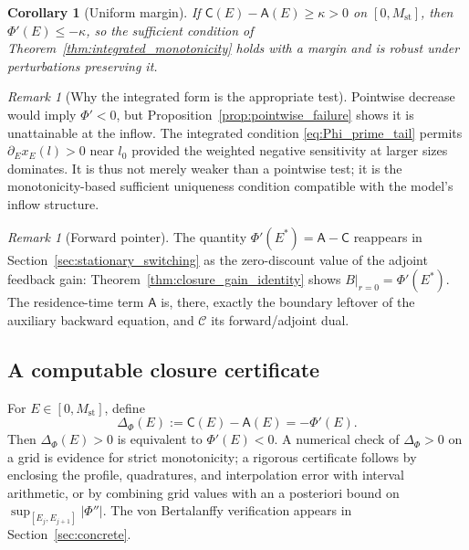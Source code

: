 \documentclass[pdflatex,sn-mathphys-num]{sn-jnl}
\theoremstyle{plain}
\newtheorem{corollary}[theorem]{Corollary}
\theoremstyle{definition}
\theoremstyle{remark}
\newtheorem{remark}[theorem]{Remark}
\begin{document}
\begin{corollary}[Uniform margin]
\label{cor:uniform_integrated_margin}
If $\mathsf C(E)-\mathsf A(E)\ge\kappa>0$ on $[0,M_{\mathrm{st}}]$, then
$\Phi'(E)\le-\kappa$, so the sufficient condition of
Theorem~\ref{thm:integrated_monotonicity} holds with a margin and is robust under
perturbations preserving it.
\end{corollary}

\begin{remark}[Why the integrated form is the appropriate test]
\label{rmk:integrated_weaker}
Pointwise decrease would imply $\Phi'<0$, but
Proposition~\ref{prop:pointwise_failure} shows it is unattainable at the inflow.
The integrated condition \eqref{eq:Phi_prime_tail} permits
$\partial_Ex_E(l)>0$ near $l_0$ provided the weighted negative sensitivity at
larger sizes dominates. It is thus not merely weaker than a pointwise test; it is
the monotonicity-based sufficient uniqueness condition compatible with the model's
inflow structure.
\end{remark}

\begin{remark}[Forward pointer]
\label{rmk:forward_pointer_unification}
The quantity $\Phi'(E^*)=\mathsf A-\mathsf C$ reappears in
Section~\ref{sec:stationary_switching} as the zero-discount value of the adjoint
feedback gain: Theorem~\ref{thm:closure_gain_identity} shows
$B|_{r=0}=\Phi'(E^*)$. The residence-time term $\mathsf A$ is, there, exactly
the boundary leftover of the auxiliary backward equation, and $\mathcal C$ its
forward/adjoint dual.
\end{remark}

\subsection{A computable closure certificate}
\label{subsec:closure_certificate}

For $E\in[0,M_{\mathrm{st}}]$, define
\[
\Delta_\Phi(E):=\mathsf C(E)-\mathsf A(E)=-\Phi'(E).
\]
Then $\Delta_\Phi(E)>0$ is equivalent to $\Phi'(E)<0$.
A numerical check of
$\Delta_\Phi>0$ on a grid is evidence for strict monotonicity; a rigorous
certificate follows by enclosing the profile, quadratures, and interpolation
error with interval arithmetic, or by combining grid values with an a posteriori
bound on $\sup_{[E_j,E_{j+1}]}|\Phi''|$. The von Bertalanffy verification appears
in Section~\ref{sec:concrete}.

\end{document}
